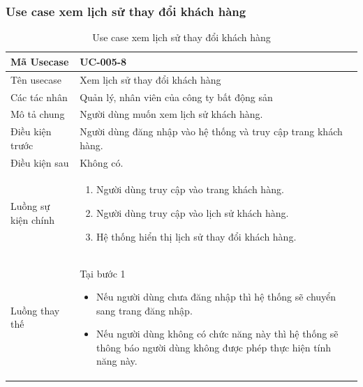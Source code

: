 \documentclass[12pt,a4paper]{article}
\begin{document}
    \subsubsection*{Use case xem lịch sử thay đổi khách hàng}
    \begin{table}[H]
        \centering
        \begin{tabular}{|p{3.5cm}|p{11.5cm}|c|}
            \hline
            Mã Usecase      & UC-005-8                                                        \\
            \hline
            Tên usecase     & Xem lịch sử thay đổi khách hàng                                 \\
            \hline
            Các tác nhân    & Quản lý, nhân viên của công ty bất động sản                     \\
            \hline
            Mô tả chung     & Người dùng muốn xem lịch sử khách hàng.                         \\
            \hline

            Điều kiện trước & Người dùng đăng nhập vào hệ thống và truy cập trang khách hàng. \\
            \hline

            Điều kiện sau   & Không có.                                                       \\
            \hline

            Luồng sự kiện chính & \vspace{-.8cm}\begin{enumerate}
                                                    \item Người dùng truy cập vào trang khách hàng.
                                                    \item Người dùng truy cập vào lịch sử khách hàng.
                                                    \item Hệ thống hiển thị lịch sử thay đổi khách hàng.
            \end{enumerate}
            \\
            \hline
            Luồng thay thế & Tại bước 1\newline
            \vspace{-.8cm}\begin{itemize}
                              \item Nếu người dùng chưa đăng nhập thì hệ thống sẽ chuyển sang trang đăng nhập.
                              \item Nếu người dùng không có chức năng này thì hệ thống sẽ thông báo người dùng không được phép thực hiện tính năng này.
            \end{itemize}
            \\ \hline
        \end{tabular}
        \caption{Use case xem lịch sử thay đổi khách hàng}
    \end{table}
\end{document}
